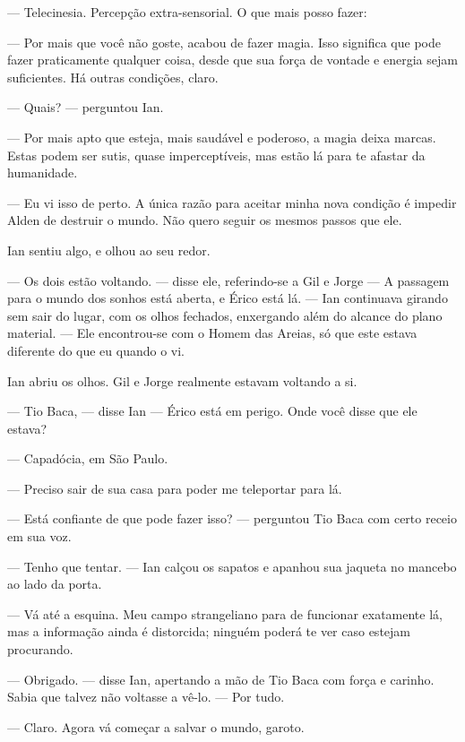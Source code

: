 --- Telecinesia. Percepção extra-sensorial. O que mais posso fazer:

--- Por mais que você não goste, acabou de fazer magia. Isso significa
que pode fazer praticamente qualquer coisa, desde que sua força de
vontade e energia sejam suficientes. Há outras condições, claro.

--- Quais? --- perguntou Ian.

--- Por mais apto que esteja, mais saudável e poderoso, a magia deixa
marcas. Estas podem ser sutis, quase imperceptíveis, mas estão lá para
te afastar da humanidade.

--- Eu vi isso de perto. A única razão para aceitar minha nova condição
é impedir Alden de destruir o mundo. Não quero seguir os mesmos passos
que ele.

Ian sentiu algo, e olhou ao seu redor.

--- Os dois estão voltando. --- disse ele, referindo-se a Gil e Jorge
--- A passagem para o mundo dos sonhos está aberta, e Érico está lá. ---
Ian continuava girando sem sair do lugar, com os olhos fechados,
enxergando além do alcance do plano material. --- Ele encontrou-se com o
Homem das Areias, só que este estava diferente do que eu quando o vi.

Ian abriu os olhos. Gil e Jorge realmente estavam voltando a si.

--- Tio Baca, --- disse Ian --- Érico está em perigo. Onde você disse que
ele estava?

--- Capadócia, em São Paulo.

--- Preciso sair de sua casa para poder me teleportar para lá.

--- Está confiante de que pode fazer isso? --- perguntou Tio Baca com
certo receio em sua voz.

--- Tenho que tentar. --- Ian calçou os sapatos e apanhou sua jaqueta no
mancebo ao lado da porta.

--- Vá até a esquina. Meu campo strangeliano para de funcionar
exatamente lá, mas a informação ainda é distorcida; ninguém poderá te
ver caso estejam procurando.

--- Obrigado. --- disse Ian, apertando a mão de Tio Baca com força e
carinho. Sabia que talvez não voltasse a vê-lo. --- Por tudo.

--- Claro. Agora vá começar a salvar o mundo, garoto.
